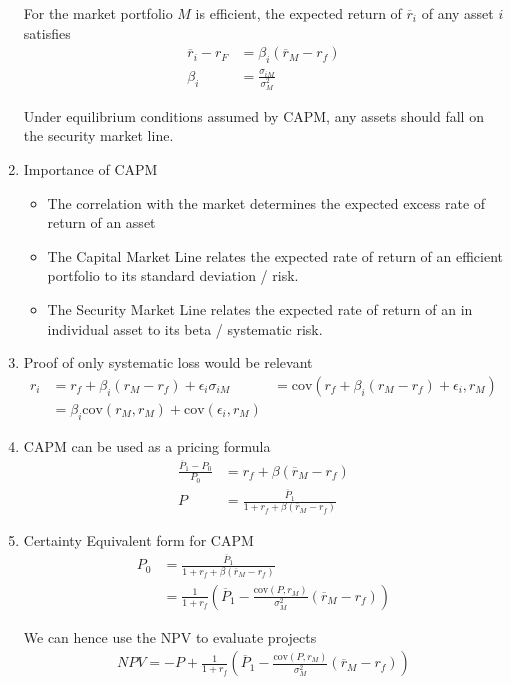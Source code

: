 \documentclass[12pt,twoside]{article}
\begin{document}
\begin{enumerate}
	 For the market portfolio $M$ is efficient, the expected return of $\overline{r}_i$ of any asset $i$ satisfies
	 \begin{align*}
	 	\overline{r}_i - r_F &= \beta_i (\overline{r}_M-r_f)\\
	 	\beta_i &=\frac{\sigma_{iM}}{\sigma^2_M}
	 \end{align*}
	 
	 Under equilibrium conditions assumed by CAPM, any assets should fall on the security market line.
	 
	 \item Importance of CAPM
	 	\begin{itemize}
	 		\item The correlation with the market determines the expected excess rate of return of an asset
	 		\item The Capital Market Line relates the expected rate of return of an efficient portfolio to its standard deviation / risk.
	 		\item The Security Market Line relates the expected rate of return of an in individual asset to its beta / systematic risk.
	 	\end{itemize}
	
	 \item Proof of only systematic loss would be relevant
	 \begin{align*}
	 	r_i 					& = r_f + \beta_i (r_M - r_f )+ \epsilon_i
	 	\sigma_{iM}		& = \text{cov} \left(r_f + \beta_i (r_M - r_f )+ \epsilon_i, r_M\right)\\
	 							& = \beta_i \text{cov}(r_M, r_M) +  \text{cov}(\epsilon_i, r_M)
	 \end{align*}
 		
		\item CAPM can be used as a pricing formula
			\begin{align*}
				\frac{\overline{P}_1 - P_0}{P_0} &=  r_f + \beta (\overline{r}_M - r_f)\\
				P & = \frac{\overline{P}_1}{1+ r_f + \beta (\overline{r}_M - r_f)}
			\end{align*}
		
		\item Certainty Equivalent form for CAPM
		\begin{align*}
			P_0 	&= \frac{\overline{P}_1 }{1+r_f + \beta (\overline{r}_M - r_f)}\\
					& = \frac{1}{1+r_f}\left(\overline{P}_1 - \frac{\text{cov}(P, r_M)}{\sigma^2_M}(\overline{r}_M - r_f) \right)
		\end{align*}
		
		We can hence use the NPV to evaluate projects
		\begin{align*}
			NPV = -P + \frac{1}{1+r_f}\left(\overline{P}_1 - \frac{\text{cov}(P, r_M)}{\sigma^2_M}(\overline{r}_M - r_f) \right)
		\end{align*}				
		
		
\end{enumerate}
\end{document}
